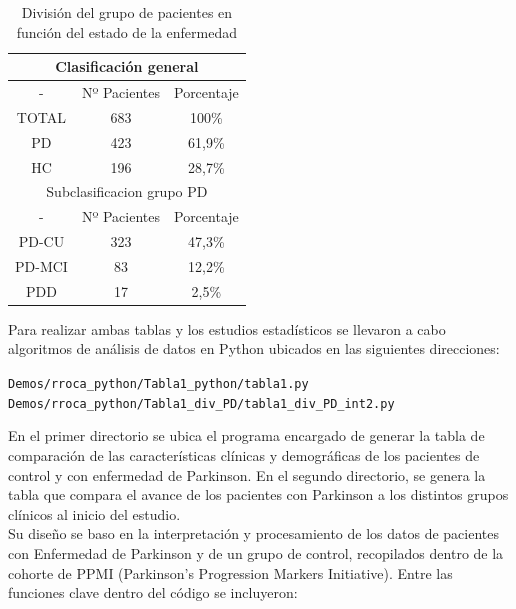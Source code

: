 \begin{table}[t]
	\centering
	\begin{tabular}{|c||c|c|} 
		\hline
		\multicolumn{3}{|c|}{Clasificación general} \\
		\hline
		- &  Nº Pacientes &  Porcentaje\\ 
		\hline
		TOTAL &  683 & 100\% \\
		\hline
		PD & 423 &  61,9\%  \\
		\hline
		HC & 196  &  28,7\%  \\
		\hline
		\multicolumn{3}{|c|}{Subclasificacion grupo PD} \\
		\hline
		- &  Nº Pacientes &  Porcentaje\\
		\hline
		PD-CU &  323 &  47,3\%  \\
		\hline
		PD-MCI &   83 &   12,2\% \\
		\hline
		PDD &  17 &  2,5\%  \\ 
		\bottomrule
	\end{tabular}
	\caption{División del grupo de pacientes en función del estado de la enfermedad}
	\label{tab:tabla4}
\end{table}


Para realizar ambas tablas y los estudios estadísticos se llevaron a cabo algoritmos de análisis de datos en Python ubicados en las siguientes direcciones:
\begin{center}
	\texttt{Demos/rroca\_python/Tabla1\_python/tabla1.py}\\
		
	\texttt{Demos/rroca\_python/Tabla1\_div\_PD/tabla1\_div\_PD\_int2.py}
\end{center} 

En el primer directorio se ubica el programa encargado de generar la tabla de comparación de las características clínicas y demográficas de los pacientes de control y con enfermedad de Parkinson. En el segundo directorio, se genera la tabla que compara el avance de los pacientes con Parkinson a los distintos grupos clínicos al inicio del estudio.\\

Su diseño se baso en la interpretación y procesamiento de los datos de pacientes con Enfermedad de Parkinson y de un grupo de control,  recopilados dentro de la cohorte de PPMI (Parkinson's Progression Markers Initiative). Entre las funciones clave dentro del código se incluyeron:

